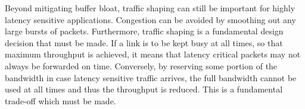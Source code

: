 Beyond mitigating buffer bloat, traffic shaping can still be important for highly latency sensitive applications. Congestion can be avoided by smoothing out any large bursts of packets. Furthermore, traffic shaping is a fundamental design decision that must be made. If a link is to be kept busy at all times, so that maximum throughput is achieved, it means that latency critical packets may not always be forwarded on time. Conversely, by reserving some portion of the bandwidth in case latency sensitive traffic arrives, the full bandwidth cannot be used at all times and thus the throughput is reduced. This is a fundamental trade-off which must be made.





















